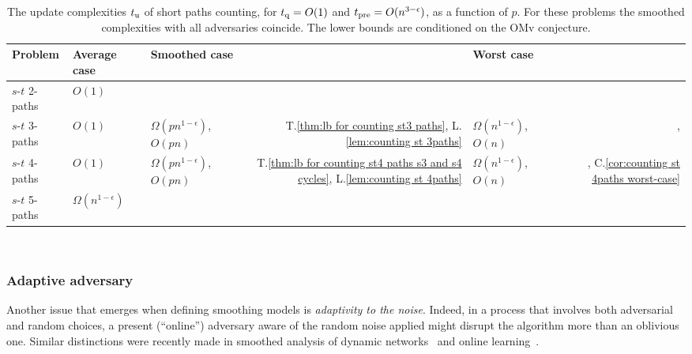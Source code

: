\documentclass[letter,11pt]{article}
\newcommand{\omv}{\textnormal{\textsf{OMv}}\xspace}
\newcommand{\st}{$s$-$t$\xspace}
\newcommand{\tp}{t_{\textnormal{pre}}}
\newcommand{\tu}{t_{\textnormal{u}}}
\newcommand{\tq}{t_{\textnormal{q}}}
\begin{document}
\begin{table*}
	\centering
	\scriptsize
	\begin{tabular}{|l|lr|lr|lr|}
		\toprule
		Problem 
		& \multicolumn{2}{l|}{Average case} 
		& \multicolumn{2}{l|}{Smoothed case} 
		& \multicolumn{2}{l|}{Worst case}\\ 
		\toprule
		
		\st 2-paths
		& \multicolumn{5}{l}{\cellcolor{lightgreen}$O(1)$		}
		&\cellcolor{lightgreen}\cite{HLS22}
		\\
		\midrule
		\st 3-paths
		&\cellcolor{lightgreen}$O(1)$
		&\cellcolor{lightgreen} \cite{HLS22}
		&\cellcolor{lightyellow}$\Omega(pn^{1-\epsilon})$, $O(pn)$
		&\cellcolor{lightyellow}T.\ref{thm:lb for counting st3 paths}, 
		L.\ref{lem:counting st 3paths}
		&\cellcolor{lightred}$\Omega(n^{1-\epsilon})$, $O(n)$		&\cellcolor{lightred}\cite{HenzingerKNS15}, \cite{HanauerHH22}
		\\
		\midrule
		\st 4-paths
		&\cellcolor{lightgreen}$O(1)$
		&\cellcolor{lightgreen} \cite{HLS22}
		&\cellcolor{lightyellow}$\Omega(pn^{1-\epsilon})$, $O(pn)$
		&\cellcolor{lightyellow}T.\ref{thm:lb for counting st4 paths s3 and s4 cycles}, 
		L.\ref{lem:counting st 4paths}
		&\cellcolor{lightred}$\Omega(n^{1-\epsilon})$, $O(n)$
		&\cellcolor{lightred}\cite{HenzingerKNS15}, C.\ref{cor:counting st 4paths worst-case}
		\\
		\midrule
		\st 5-paths
		&\cellcolor{lightred}$\Omega(n^{1-\epsilon})$
		& 
		\multicolumn{5}{r|}{\cellcolor{lightred}\cite{HLS22}}
		\\
		\bottomrule
	\end{tabular}
	~
	\caption{%
		The update complexities $\tu$ of short paths counting,
		for $\tq=O(1)$ and 
		$\tp=O(n^{3-\epsilon})$, as a function of $p$.
		For these problems the smoothed complexities with all adversaries coincide.
		The lower bounds are conditioned on the \omv conjecture.}
	\label{table: short paths counting}
\end{table*}


\subsubsection{Adaptive adversary}
Another issue that emerges when defining smoothing models is \emph{adaptivity to the noise}.
Indeed, in a process that involves both adversarial and random choices, a present (``online'') adversary 
aware of the random noise applied 
might disrupt the algorithm more than an oblivious one.
Similar distinctions were recently made in smoothed analysis of dynamic networks~\cite{MPS20} and online learning~\cite{HRS21}. 
\end{document}
